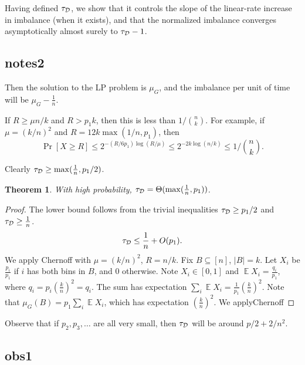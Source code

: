 \documentclass[10pt,conference,letterpaper]{IEEEtran}
\newcommand{\mycomment}[1]{}
\DeclareMathOperator*{\expect}{\mathbb{E}}
\newtheorem{theorem}{Theorem}[section]
\begin{document}
{Having defined $\tau_{\mathcal D}$, we show that it controls the slope of the linear-rate increase in imbalance (when it exists),
       and that  the normalized imbalance converges asymptotically almost surely to $\tau_{\mathcal D} - 1$.




\subsection{notes2}
Then the solution to the LP problem is $\mu_G$, and the imbalance per unit of time will be $\mu_G - \frac{1}{n}$.

If $R \ge \mu n / k$ and $R > p_1 k$, then this is less than $1/\binom{n}{k}$.
For example, if $\mu = (k / n)^2$ and $R = 12 k \max(1/n, p_1)$, then
$$ \Pr[ X \ge R ] \le 2^{-(R/6 p_1) \log (R/\mu)} \le 2^{-2 k \log(n / k)} \le 1/\binom{n}{k}. $$



Clearly $\tau_{\mathcal D} \ge \max(\frac{1}{n}, p_1 / 2)$.
\begin{theorem}
With high probability, $\tau_{\mathcal D} = \Theta(\max(\frac{1}{n}, p_1))$.
\end{theorem}
\begin{proof}
The lower bound follows from the trivial inequalities $\tau_{\mathcal D} \ge p_1 / 2$ and $\tau_{\mathcal D} \ge \frac{1}{n}$.
$$ \tau_{\mathcal D} \le \frac{1}{n} + O(p_1).$$
We apply Chernoff with $\mu = (k / n)^2$, $R = n / k$.
Fix $B \subseteq [n]$, $|B| = k$. Let $X_i$ be $\frac{p_i}{p_1}$ if $i$ has both bins in $B$, and 0 otherwise. Note $X_i \in [0, 1]$
and $\expect X_i = \frac{q_i}{p_1}$, where $q_i= p_i \left(\frac kn\right)^2 = q_i$.
The sum has expectation $\sum_i \expect X_i = \frac{1}{p_1} (\frac kn)^2$.
Note that $\mu_G(B) = p_1 \sum_i \expect X_i$, which has expectation $(\frac kn)^2$.
We applyChernoff

\end{proof}
Observe that if $p_2, p_3, \ldots$ are all very small, then
$\tau_{\mathcal D}$ will be around $p/2+2/n^2$.
\subsection{obs1}
\mycomment{
It is well known that with one choice, the imbalance grows as $\Theta(\sqrt{m \log n / n}$.

After seeing $n / 2$ keys, I have occupied $n(1-1/e)$ bins. Let $\tau = p_1 + \ldots + p_{n/2}$.
There is now a set of fractional size $x=1-1/e$ with mass $\tau + (1 - \tau)x^2$,
      hence $\mu(B) \ge \tau/x+(1-\tau)x = x+\tau(1/x -x) = 0.6312 + 0.94986 \tau$. If $\tau \ge x/(1+x) = 0.36788$, this is larger than one.

}}
\end{document}
